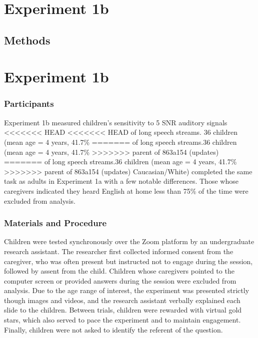 \documentclass[10pt, letterpaper]{article}
\begin{document}
\hypertarget{experiment-1b}{%
\section{Experiment 1b}\label{experiment-1b}}

\hypertarget{methods-1}{%
\subsection{Methods}\label{methods-1}}

\hypertarget{experiment-1b-1}{%
\section{Experiment 1b}\label{experiment-1b-1}}

\hypertarget{participants-1}{%
\subsubsection{Participants}\label{participants-1}}

Experiment 1b measured children's sensitivity to 5 SNR auditory signals
<<<<<<< HEAD
<<<<<<< HEAD
of long speech streams. 36 children (mean age = 4 years, 41.7\%
=======
of long speech streams.36 children (mean age = 4 years, 41.7\%
>>>>>>> parent of 863a154 (updates)
=======
of long speech streams.36 children (mean age = 4 years, 41.7\%
>>>>>>> parent of 863a154 (updates)
Caucasian/White) completed the same task as adults in Experiment 1a with
a few notable differences. Those whose caregivers indicated they heard
English at home less than 75\% of the time were excluded from analysis.

\hypertarget{materials-and-procedure-1}{%
\subsubsection{Materials and
Procedure}\label{materials-and-procedure-1}}

Children were tested synchronously over the Zoom platform by an
undergraduate research assistant. The researcher first collected
informed consent from the caregiver, who was often present but
instructed not to engage during the session, followed by assent from the
child. Children whose caregivers pointed to the computer screen or
provided answers during the session were excluded from analysis. Due to
the age range of interest, the experiment was presented strictly though
images and videos, and the research assistant verbally explained each
slide to the children. Between trials, children were rewarded with
virtual gold stars, which also served to pace the experiment and to
maintain engagement. Finally, children were not asked to identify the
referent of the question.
\end{document}
